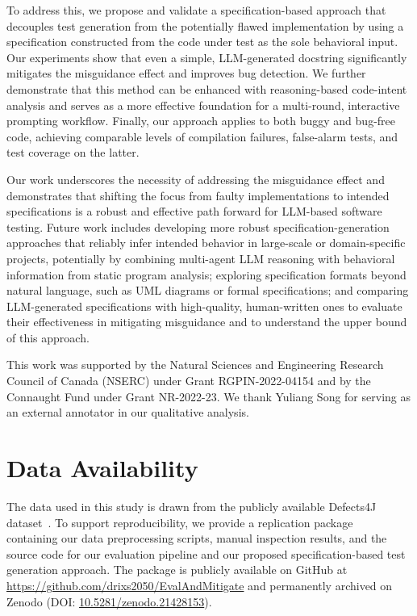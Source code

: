 \documentclass[acmsmall]{acmart}
\begin{document}
To address this, we propose and validate a specification-based approach that decouples test generation from the potentially flawed implementation by using a specification constructed from the code under test as the sole behavioral input. Our experiments show that even a simple, LLM-generated docstring significantly mitigates the misguidance effect and improves bug detection. We further demonstrate that this method can be enhanced with reasoning-based code-intent analysis and serves as a more effective foundation for a multi-round, interactive prompting workflow. Finally, our approach applies to both buggy and bug-free code, achieving comparable levels of compilation failures, false-alarm tests, and test coverage on the latter.

Our work underscores the necessity of addressing the misguidance effect and demonstrates that shifting the focus from faulty implementations to intended specifications is a robust and effective path forward for LLM-based software testing. Future work includes developing more robust specification-generation approaches that reliably infer intended behavior in large-scale or domain-specific projects, potentially by combining multi-agent LLM reasoning with behavioral information from static program analysis; exploring specification formats beyond natural language, such as UML diagrams or formal specifications; and comparing LLM-generated specifications with high-quality, human-written ones to evaluate their effectiveness in mitigating misguidance and to understand the upper bound of this approach.

\begin{acks}
This work was supported by the Natural Sciences and Engineering Research Council of Canada (NSERC) under Grant RGPIN-2022-04154 and by the Connaught Fund under Grant NR-2022-23. We thank Yuliang Song for serving as an external annotator in our qualitative analysis.
\end{acks}

\section*{Data Availability}
The data used in this study is drawn from the publicly available Defects4J dataset~\citep{Defects4j}. To support reproducibility, we provide a replication package~\citep{zhao2026replication} containing our data preprocessing scripts, manual inspection results, and the source code for our evaluation pipeline and our proposed specification-based test generation approach. The package is publicly available on GitHub at \url{https://github.com/drixs2050/EvalAndMitigate} and permanently archived on Zenodo (DOI: \href{https://doi.org/10.5281/zenodo.21428153}{10.5281/zenodo.21428153}).
\end{document}
